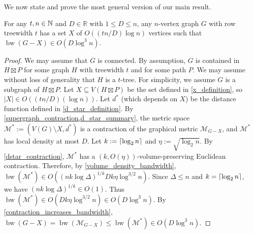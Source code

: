 \documentclass{patmorin}
\renewcommand{\le}{\leqslant}
\renewcommand{\leq}{\leqslant}
\newcommand{\david}[1]{{\color{orange} David: #1}}
\DeclareMathOperator{\bw}{bw}
\begin{document}


We now state and prove the most general version of our main result.

\begin{thm}
\label{main_thm_products_D}
For any $t,n\in\mathbb{N}$ and $D\in\mathbb{R}$ with $1\leq D\leq n$, any $n$-vertex graph $G$ with row treewidth $t$ has a set $X$ of $O((tn/D)\log n)$ vertices such that $\bw(G-X)\in O(D\log^3 n)$.
\end{thm}

\begin{proof}
We may assume that $G$ is connected.
By assumption, $G$ is contained in $H\boxtimes P$ for some graph $H$ with treewidth $t$ and for some path $P$.
We may assume without loss of generality that $H$ is a $t$-tree. For simplicity, we assume $G$ is a subgraph of $H\boxtimes P$. Let $X\subseteq V(H\boxtimes P)$ be the set defined in \cref{x_definition}, so $|X|\in O((tn/D)(\log n))$. Let $d^*$ (which depends on $X$) be the distance function defined in \cref{d_star_definition}.  By \cref{supergraph_contraction,d_star_summary}, the metric space $\mathcal{M}^*:=(V(G)\setminus X,d^*)$ is a contraction of the graphical metric $\mathcal{M}_{G-X}$, and
$\mathcal{M}^*$ has local density at most $D$. Let $k:={\lceil \log_2n \rceil}$ and $\eta:=\sqrt{\log_2 n}$.
By \cref{dstar_contraction}, $\mathcal{M}^*$ has a $(k,O(\eta))$-volume-preserving Euclidean contraction.  Therefore, by \cref{volume_density_bandwidth}, $\bw(\mathcal{M}^*)\in
O( (nk\log\Delta)^{1/k} Dk\eta \log^{3/2} n)$.
Since $\Delta\leq n$ and $k={\lceil \log_2n \rceil}$, we have
$(nk\log\Delta)^{1/k}\in O(1)$.
Thus
$\bw(\mathcal{M}^*)\in O(  Dk\eta \log^{3/2} n) \in O(D\log^3 n)$.
By \cref{contraction_increases_bandwidth}, $\bw(G-X) =\bw(\mathcal{M}_{G-X})\le \bw(\mathcal{M}^*) \in
O(D\log^3 n)$.
\end{proof}
\end{document}
